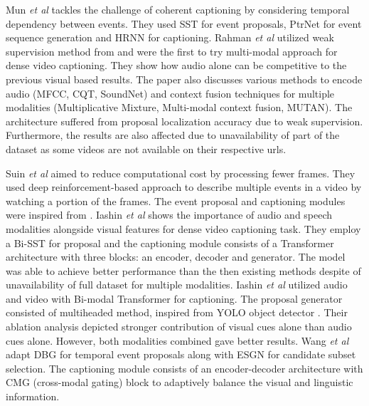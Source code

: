\par Mun \textit{et al} \cite{mun2019streamlined} tackles the challenge of coherent captioning by considering temporal dependency between events. They used SST for event proposals, PtrNet for event sequence generation and HRNN for captioning. Rahman \textit{et al} \cite{rahman2019watch} utilized weak supervision method from \cite{duan2018weakly} and were the first to try multi-modal approach for dense video captioning. They show how audio alone can be competitive to the previous visual based results. The paper also discusses various methods to encode audio (MFCC, CQT, SoundNet) and context fusion techniques for multiple modalities (Multiplicative Mixture, Multi-modal context fusion, MUTAN). The architecture suffered from proposal localization accuracy due to weak supervision. Furthermore, the results are also affected due to unavailability of part of the dataset as some videos are not available on their respective urls.

\par \sloppy Suin \textit{et al} \cite{suin2020efficient} aimed to reduce computational cost by processing fewer frames. They used deep reinforcement-based approach to describe multiple events in a video by watching a portion of the frames. The event proposal and captioning modules were inspired from \cite{zhou2018end}. Iashin \textit{et al} \cite{iashin2020multimodal} shows the importance of audio and speech modalities alongside visual features for dense video captioning task. They employ a Bi-SST for proposal and the captioning module consists of a Transformer architecture with three blocks: an encoder, decoder and generator. The model was able to achieve better performance than the then existing methods despite of unavailability of full dataset for multiple modalities. Iashin \textit{et al} \cite{iashin2020better} utilized audio and video with Bi-modal Transformer for captioning. The proposal generator consisted of multiheaded method, inspired from YOLO object detector \cite{yolo}. Their ablation analysis depicted stronger contribution of visual cues alone than audio cues alone. However, both modalities combined gave better results. Wang \textit{et al} \cite{wang2020densecaptioning} adapt DBG \cite{lin2019fast} for temporal event proposals along with ESGN \cite{mun2019streamlined} for candidate subset selection. The captioning module consists of an encoder-decoder architecture with CMG (cross-modal gating) block to adaptively balance the visual and linguistic information.

